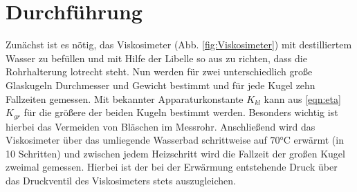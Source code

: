 \section{Durchführung}
\label{sec:Durchführung}
Zunächst ist es nötig, das Viskosimeter (Abb. \ref{fig:Viskosimeter}) mit destilliertem Wasser zu befüllen und mit Hilfe der Libelle so aus zu richten, dass die Rohrhalterung lotrecht steht. Nun werden für zwei unterschiedlich große Glaskugeln Durchmesser und Gewicht bestimmt und für jede Kugel zehn Fallzeiten gemessen. Mit bekannter Apparaturkonstante $K_{kl}$ kann aus \eqref{eqn:eta} $K_{gr}$ für die größere der beiden Kugeln bestimmt werden. Besonders wichtig ist hierbei das Vermeiden von Bläschen im Messrohr.
Anschließend wird das Viskosimeter über das umliegende Wasserbad schrittweise auf $70 \si{\celsius}$ erwärmt (in 10 Schritten) und zwischen jedem Heizschritt wird die Fallzeit der großen Kugel zweimal gemessen. Hierbei ist der bei der Erwärmung entstehende Druck über das Druckventil des Viskosimeters stets auszugleichen.
